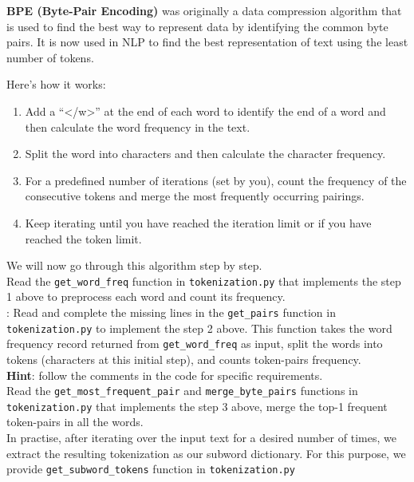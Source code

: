 \textbf{BPE (Byte-Pair Encoding)} was originally a data compression algorithm that is used to find the best way to represent data by identifying the common byte pairs. It is now used in NLP to find the best representation of text using the least number of tokens.

Here's how it works:
\begin{enumerate}
    \item Add a ``</w>'' at the end of each word to identify the end of a word and then calculate the word frequency in the text.
    \item Split the word into characters and then calculate the character frequency.
    \item For a predefined number of iterations (set by you), count the frequency of the consecutive tokens and merge the most frequently occurring pairings.
    \item Keep iterating until you have reached the iteration limit or if you have reached the token limit.
\end{enumerate}
We will now go through this algorithm step by step.\\

\noindent Read the \texttt{get\_word\_freq} function in \texttt{tokenization.py} that implements the step 1 above to preprocess each word and count its frequency.\\

\noindent \todo{}: Read and complete the missing lines in the \texttt{get\_pairs} function in \texttt{tokenization.py} to implement the step 2 above. This function takes the word frequency record returned from \texttt{get\_word\_freq} as input, split the words into tokens (characters at this initial step), and counts token-pairs frequency.\\
\noindent \textbf{Hint}: follow the comments in the code for specific requirements.\\

\noindent Read the \texttt{get\_most\_frequent\_pair} and \texttt{merge\_byte\_pairs} functions in \texttt{tokenization.py} that implements the step 3 above, merge the top-1 frequent token-pairs in all the words.\\

In practise, after iterating over the input text for a desired number of times, we extract the resulting tokenization as our subword dictionary. For this purpose, we provide \texttt{get\_subword\_tokens} function in \texttt{tokenization.py}\\

